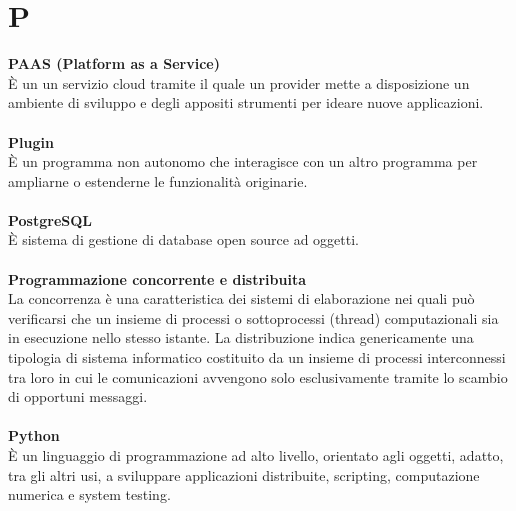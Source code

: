 \section{P}
\textbf{PAAS (Platform as a Service)}\\
È un un servizio cloud tramite il quale un provider mette a disposizione un ambiente di sviluppo e degli appositi strumenti per ideare nuove applicazioni. \\ \\
\textbf{Plugin}\\
È un programma non autonomo che interagisce con un altro programma per ampliarne o estenderne le funzionalità originarie. \\ \\
\textbf{PostgreSQL}\\
È sistema di gestione di database open source ad oggetti. \\ \\
\textbf{Programmazione concorrente e distribuita}\\
La concorrenza è una caratteristica dei sistemi di elaborazione nei quali può verificarsi che un insieme di processi o sottoprocessi (thread) computazionali sia in esecuzione nello stesso istante. La distribuzione indica genericamente una tipologia di sistema informatico costituito da un insieme di processi interconnessi tra loro in cui le comunicazioni avvengono solo esclusivamente tramite lo scambio di opportuni messaggi. \\ \\
\textbf{Python}\\
È un linguaggio di programmazione ad alto livello, orientato agli oggetti, adatto, tra gli altri usi, a sviluppare applicazioni distribuite, scripting, computazione numerica e system testing. \\ \\
\clearpage